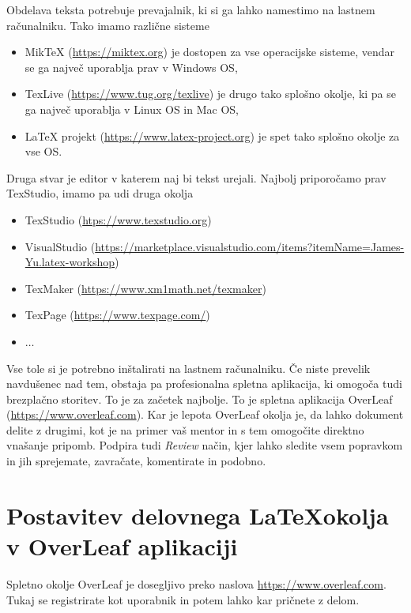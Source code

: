 \documentclass[12pt]{article}
\theoremstyle{definition}
\begin{document}
Obdelava teksta potrebuje prevajalnik, ki si ga lahko namestimo na lastnem računalniku. Tako imamo različne sisteme

\begin{itemize}[nosep]
	\item MikTeX (\url{https://miktex.org}) je dostopen za vse operacijske sisteme, vendar se ga največ uporablja prav v Windows OS,
	\item TexLive (\url{https://www.tug.org/texlive}) je drugo tako splošno okolje, ki pa se ga največ uporablja v Linux OS in Mac OS,
	\item LaTeX projekt (\url{https://www.latex-project.org}) je spet tako splošno okolje za vse OS.
\end{itemize} 

Druga stvar je editor v katerem naj bi tekst urejali. Najbolj priporočamo prav TexStudio, imamo pa udi druga okolja

\begin{itemize}[nosep]
	\item TexStudio (\url{htps://www.texstudio.org})
	\item VisualStudio (\url{https://marketplace.visualstudio.com/items?itemName=James-Yu.latex-workshop})
	\item TexMaker (\url{https://www.xm1math.net/texmaker})
	\item TexPage (\url{https://www.texpage.com/})
	\item $\dots$
\end{itemize}

Vse tole si je potrebno inštalirati na lastnem računalniku. Če niste prevelik navdušenec nad tem, obstaja pa profesionalna spletna aplikacija, ki omogoča tudi brezplačno storitev. To je za začetek najbolje. To je spletna aplikacija OverLeaf (\url{https://www.overleaf.com}). Kar je lepota OverLeaf okolja je, da lahko dokument delite z drugimi, kot je na primer vaš mentor in s tem omogočite direktno vnašanje pripomb. Podpira tudi \emph{Review} način, kjer lahko sledite vsem popravkom in jih sprejemate, zavračate, komentirate in podobno.


\newpage
\section{Postavitev delovnega \LaTeX okolja v OverLeaf aplikaciji}
\label{sec:Overleaf}

Spletno okolje OverLeaf je dosegljivo preko naslova \href{https://www.overleaf.com}{https://www.overleaf.com}. Tukaj se registrirate kot uporabnik in potem lahko kar pričnete z delom.
\end{document}
